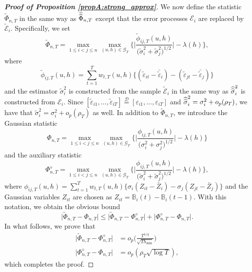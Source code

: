 \begin{proof}[\textnormal{\textbf{Proof of Proposition \ref{propA:strong_approx}}}]
We now define the statistic $\widetilde{\Phi}_{n,T}$ in the same way as $\widehat{\widehat{\Phi}}_{n, T}$ except that the error processes $\mathcal{E}_i$ are replaced by $\widetilde{\mathcal{E}}_i$. Specifically, we set
\[ \widetilde{\Phi}_{n,T} = \max_{1 \le i < j \le n}\max_{(u,h) \in \mathcal{G}_T} \Bigg\{ \bigg|\frac{\widetilde{\phi}_{ij, T}(u,h)}{\big(\widetilde{\sigma}_i^2 + \widetilde{\sigma}_j^2 \big)^{1/2}} \bigg| - \lambda(h)\Bigg\}, \]
where
\[ \widetilde{\phi}_{ij, T}(u,h) = \sum\limits_{t=1}^T w_{t,T}(u,h) \big\{ (\widetilde{\varepsilon}_{it} - \bar{\widetilde{\varepsilon}}_i)  - (\widetilde{\varepsilon}_{jt} - \bar{\widetilde{\varepsilon}}_j)\big\} \]
and the estimator $\widetilde{\sigma}^2_i$ is constructed from the sample $\widetilde{\mathcal{E}}_i$ in the same way as $\widehat{\widehat{\sigma}}^2_i$ is constructed from $\mathcal{E}_i$. Since $[\widetilde{\varepsilon}_{i1},\ldots,\widetilde{\varepsilon}_{iT}] \stackrel{\mathcal{D}}{=} [\varepsilon_{i1},\ldots,\varepsilon_{iT}]$ and $\widehat{\widehat{\sigma}}_i^2 = \sigma_i^2 + o_p(\rho_T)$, we have that $\widetilde{\sigma}_i^2 = \sigma_i^2 + o_p(\rho_T)$ as well. In addition to $\widetilde{\Phi}_{n,T}$, we introduce the Gaussian statistic
\[ \Phi_{n, T} = \max_{1\leq i< j \leq n}\max_{(u,h) \in \mathcal{G}_T} \bigg\{ \bigg|\frac{\phi_{ij, T}(u,h)}{\big(\sigma_i^2 + \sigma_j^2 \big)^{1/2}}\bigg| - \lambda(h) \bigg\} \]
and the auxiliary statistic 
\[ \Phi_{n, T}^{\diamond} = \max_{1\leq i<j \leq n}\max_{(u,h) \in \mathcal{G}_T} \bigg\{ \bigg|\frac{\phi_{ij, T}(u,h)}{\big(\widetilde{\sigma}_i^2 + \widetilde{\sigma}_j^2 \big)^{1/2}}\bigg| - \lambda(h) \bigg\}, \]
where $\phi_{ij,T}(u,h) = \sum\nolimits_{t=1}^T w_{t,T}(u,h) \{ \sigma_i (Z_{it} - \bar{Z}_i) - \sigma_j (Z_{jt} - \bar{Z}_j) \}$ and the Gaussian variables $Z_{it}$ are chosen as $Z_{it} = \mathbb{B}_i(t) - \mathbb{B}_i(t-1)$. With this notation, we obtain the obvious bound 
\begin{equation*}
\big| \widetilde{\Phi}_{n, T} - \Phi_{n, T} \big| \le \big| \widetilde{\Phi}_{n, T} - \Phi_{n, T}^{\diamond} \big| + \big| \Phi_{n, T}^{\diamond} - \Phi_{n, T} \big|. 
\end{equation*}
In what follows, we prove that 
\begin{align}
\big| \widetilde{\Phi}_{n, T} - \Phi_{n, T}^{\diamond} \big| & = o_p\Big( \frac{T^{1/q}}{\sqrt{Th_{\min}}} \Big) \label{eq-strongapprox-bound-A} \\
\big| \Phi_{n, T}^{\diamond} - \Phi_{n, T} \big| & = o_p(\rho_T \sqrt{\log T}), \label{eq-strongapprox-bound-B}
\end{align}
which completes the proof. 



\end{proof}

